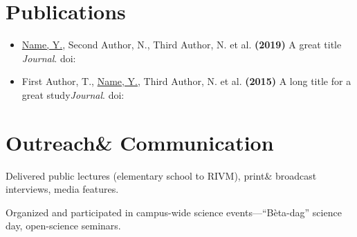 \documentclass[a4paper,10pt]{article}
\begin{document}
\section*{Publications}
\begin{itemize}
\item \underline{Name, Y.}, Second Author, N., Third Author, N. et al. \textbf{(2019)} A great title {\it Journal}. doi:~
\item First Author, T., \underline{Name, Y.}, Third Author, N. et al. \textbf{(2015)} A long title for a great study{\it Journal}. doi:~
\end{itemize}




\section*{Outreach\& Communication}
\begin{description}
\raggedright
\item Delivered public lectures (elementary school to RIVM), print\& broadcast interviews, media features.
\item Organized and participated in campus-wide science events—“Bèta-dag” science day, open-science seminars.
\end{description}
\end{document}
